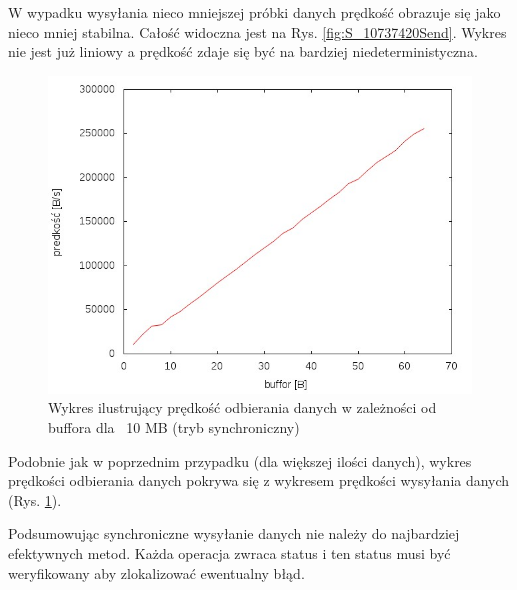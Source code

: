 \documentclass{BscUS}
\begin{document}
W wypadku wysyłania nieco mniejszej próbki danych prędkość obrazuje się jako nieco mniej stabilna. Całość widoczna jest na Rys. \ref{fig:S_10737420Send}. Wykres nie jest już liniowy a prędkość zdaje się być na bardziej niedeterministyczna.

\begin{figure}[H]
{
\centering
\includegraphics{./img/S_10737420Receive}
\caption{Wykres ilustrujący prędkość odbierania danych w zależności od buffora dla ~10 MB (tryb synchroniczny)}
\label{fig:S_10737420Receive}
}
\end{figure}
Podobnie jak w poprzednim przypadku (dla większej ilości danych), wykres prędkości odbierania danych pokrywa się z wykresem prędkości wysyłania danych (Rys. \ref{fig:S_10737420Receive}).

Podsumowując synchroniczne wysyłanie danych nie należy do najbardziej efektywnych metod. Każda operacja zwraca status i ten status musi być weryfikowany aby zlokalizować ewentualny błąd.
\newline
\end{document}
